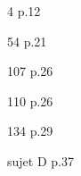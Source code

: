 \documentclass[10pt,a4paper,openany,twoside]{book}
\begin{document}
		\begin{bookact}{4 p.12}\end{bookact}
		\begin{bookexo}{54 p.21}\end{bookexo}
		\begin{bookexo}{107 p.26}\end{bookexo}
		\begin{bookexo}{110 p.26\alg}\end{bookexo}
		\begin{bookexo}{134 p.29\train}\end{bookexo}

		\begin{bookexo}{sujet D p.37}\end{bookexo}



\end{document}
